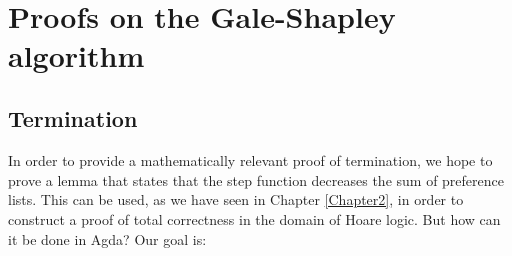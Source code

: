 {\begin{code}%
\>[0]\AgdaSymbol{\{-\#}\AgdaSpace{}%
\AgdaSpace{}%
\AgdaSymbol{\#-\}}\<%
\\
\>[0]\AgdaSpace{}%
\AgdaSymbol{:}\AgdaSpace{}%
\AgdaSymbol{(}\AgdaSpace{}%
\AgdaSymbol{:}\AgdaSpace{}%
\AgdaSymbol{)}\AgdaSpace{}%
\AgdaSpace{}%
\<%
\\
\>[0]%
\>[923I]\AgdaSymbol{(}\AgdaSpace{}%
\AgdaSpace{}%
\AgdaInductiveConstructor{[]}\AgdaSpace{}%
\AgdaSpace{}%
\AgdaSpace{}%
\AgdaSpace{}%
\AgdaSpace{}%
\AgdaSymbol{)}\AgdaSpace{}%
\AgdaSymbol{=}\<%
\\
\>[.][@{}l@{}]\<[923I]%
\>[9]\AgdaSpace{}%
\AgdaSpace{}%
\AgdaInductiveConstructor{[]}\AgdaSpace{}%
\AgdaSpace{}%
\AgdaSpace{}%
\AgdaSpace{}%
\AgdaSpace{}%
\<%
\\
\>[0]\AgdaSpace{}%
\AgdaSpace{}%
\AgdaSymbol{=}\AgdaSpace{}%
\AgdaSpace{}%
\AgdaSymbol{(}\AgdaSpace{}%
\AgdaSymbol{)}\<%
\end{code}

\section{Proofs on the Gale-Shapley algorithm}

\subsection{Termination}

In order to provide a mathematically relevant proof of termination, we hope to prove a lemma that states that the step function decreases the sum of preference lists. This can be used, as we have seen in Chapter \ref{Chapter2}, in order to construct a proof of total correctness in the domain of Hoare logic. But how can it be done in Agda? Our goal is:

}
